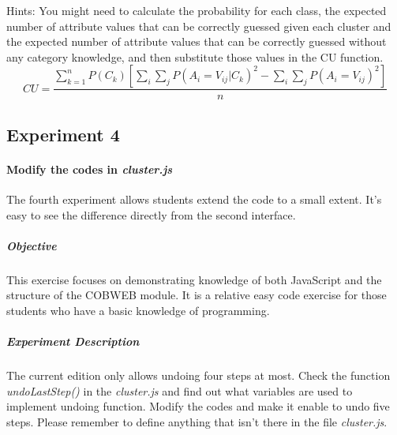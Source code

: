  Hints: You might need to calculate the probability for each class, the expected number of attribute values that can be correctly guessed given each cluster and the expected number of attribute values that can be correctly guessed without any category knowledge, and then substitute those values in the CU function.
 \begin{equation*}
 \label{eq:cu}
 CU=\frac{\sum_{k=1}^{n}P(C_k)\left[\sum_i \sum_jP(A_i=V_{ij}\left|C_k\right.)^2-\sum_i \sum_jP(A_i=V_{ij})^2\right]}{n}
 \end{equation*} 
 \begin{table}[!ht]
 \end{table}

\subsection{Experiment 4}
\paragraph{Modify the codes in \emph{cluster.js}} The fourth experiment allows students extend the code to a small extent. It's easy to see the difference directly from the second interface. 
\subparagraph{Objective} This exercise focuses on demonstrating knowledge of both JavaScript and the structure of the COBWEB module. It is a relative easy code exercise for those students who have a basic knowledge of programming. 
\subparagraph{Experiment Description} The current edition only allows undoing four steps at most. Check the function \emph{undoLastStep()} in the \emph{cluster.js} and find out what variables are used to implement undoing function. Modify the codes and make it enable to undo five steps. Please remember to define anything that isn't there in the file \emph{cluster.js}.


